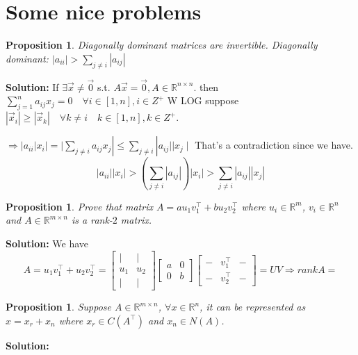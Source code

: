 \documentclass[13pt]{article}
\newtheorem{proposition}[theorem]{Proposition}
\theoremstyle{definition}
\newenvironment{solution}
{\color{C2}\begin{framed}\begingroup\textbf{Solution:} }
  {\endgroup\end{framed}}
\theoremstyle{remark}
\begin{document}
\section{Some nice problems}
\begin{proposition}
  Diagonally dominant matrices are invertible.
Diagonally dominant: $\left|a_{i i}\right|>\sum_{j \neq i}\left|a_{i j}\right|$
\end{proposition}
\begin{solution}
    If $\exists \vec{x} \neq \overrightarrow{0}$ s.t. $A \vec{x}=\overrightarrow{0}, A \in \mathbb{R}^{n \times n}$.
then $\sum_{j=1}^n a_{i j} x_j=0 \quad \forall i \in[1, n], i \in Z^{+}$
W LOG suppose $\left|\vec{x}_i\right| \ge\left|\vec{x}_k\right| \quad \forall k \neq i \quad k \in[1, n], k \in Z^{+}$.

$\Rightarrow\left|a_{i i}\right| x_i|=| \sum_{j \neq i} a_{i j} x_j\left|\leqslant \sum_{j \neq i}\right| a_{i j}|| x_j \mid$
That's a contradiction since we have.
$$
\left|a_{ii}\right|\left|x_i\right|>\left(\sum_{j\ne i}\left|a_{i j}\right|\right)\left|x_i\right|>\sum_{j \neq i}\left|a_{i j}\right|\left|x_j\right|
$$
\end{solution}


\begin{proposition}
    Prove that matrix $A = au_1v_1^\top + bu_2v_2^\top$ where $u_i\in\mathbb{R}^m$, $v_i\in\mathbb{R}^n$ and $A\in\mathbb{R}^{m\times n}$ is a rank-$2$ matrix.
\end{proposition}
\begin{solution}
    We have 
    \[
    A = u_1v_1^\top + u_2v_2^\top = \begin{bmatrix}
        | & |\\
        u_1 & u_2\\
        | & |
    \end{bmatrix}\begin{bmatrix}
        a & 0\\
        0 & b
    \end{bmatrix}\begin{bmatrix}
        - & v_1^\top & -\\
        - & v_2^\top & -
    \end{bmatrix} = UV \Longrightarrow rank A = 
    \]
    
\end{solution}

\begin{proposition}
    Suppose $A\in \mathbb{R}^{m\times n}$, $\forall x\in \mathbb{R}^n$, it can be represented as $x = x_r + x_n$ where $x_r \in C(A^\top)$ and $x_n \in N(A)$.
\end{proposition}
\begin{solution}
    
\end{solution}
\end{document}
